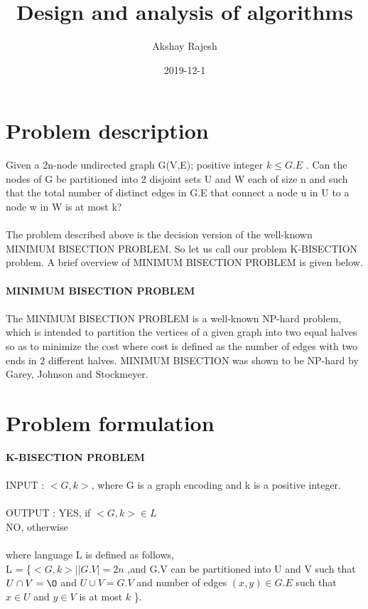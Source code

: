 \documentclass[10pt]{article}
\title{Design and analysis of algorithms}
\date{2019-12-1}
\author{Akshay Rajesh}
\begin{document}
\maketitle
{}

\newpage
\tableofcontents
{}

\newpage
{}

\section{Problem description}
Given a 2n-node undirected graph G(V,E); positive integer $k \leq G.E$ . Can the nodes of G be partitioned into 2 disjoint sets U and W each of size n and such that the total number of distinct edges in G.E that connect a node u in U to a node w in W is at most k?
\\
\\
The problem described above is the decision version of the well-known MINIMUM BISECTION PROBLEM. So let us call our problem K-BISECTION problem. A brief overview of MINIMUM BISECTION PROBLEM is given below.
\\
\\
\textbf{MINIMUM BISECTION PROBLEM}
\\\\
The MINIMUM BISECTION PROBLEM is a well-known NP-hard problem, which is intended to partition the vertices of a given graph into two equal halves so as to minimize the cost where cost is defined as the number of edges with two ends in 2 different halves. MINIMUM BISECTION was shown to be NP-hard by Garey, Johnson and Stockmeyer\cite{minbisectioncompleteness}.

\section{Problem formulation}
\textbf{K-BISECTION  PROBLEM }
\\\\
INPUT : $<G,k>$, where G is a graph encoding and k is a positive integer.\\\\
OUTPUT : YES, if $<G,k> \in L$\\
	     \hspace*{50pt} NO, otherwise \\\\
where language L is defined as follows, \\
L = \{$<G,k> | |G.V|=2n$ ,and G.V can be partitioned into U and V such that $U \cap V = \O$ and  $U \cup V= G.V$ and number of edges $(x,y) \in G.E$ such that $x \in U$ and $y \in V$ is at most $k$  \}.
\end{document}

